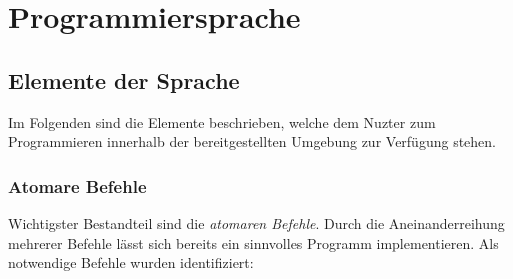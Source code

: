 \section{Programmiersprache}
\label{sec:implementation:program}

\TODO{}

\subsection{Elemente der Sprache}
\label{sec:implementation:program:elements}

Im Folgenden sind die Elemente beschrieben, welche dem Nuzter zum Programmieren innerhalb der bereitgestellten Umgebung zur Verfügung stehen.

\subsubsection{Atomare Befehle}
\label{sec:implementation:program:elements:cmds}

Wichtigster Bestandteil sind die \emph{atomaren Befehle}. Durch die Aneinanderreihung mehrerer Befehle lässt sich bereits ein sinnvolles Programm implementieren. Als notwendige Befehle wurden identifiziert:


